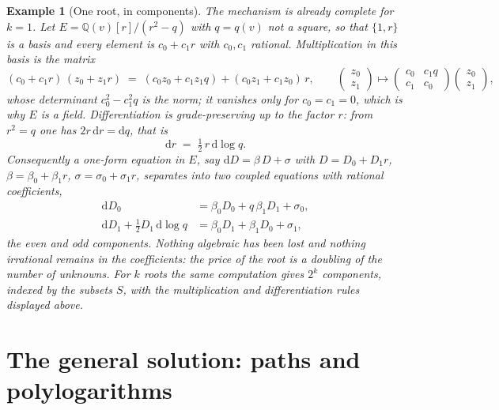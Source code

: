 \documentclass[11pt]{article}
\newcommand{\dd}{\mathrm{d}}
\newcommand{\Q}{\mathbb{Q}}
\newtheorem{example}[definition]{Example}
\begin{document}
\begin{example}[One root, in components]
\label{ex:galois1}
The mechanism is already complete for $k=1$.  Let
$E = \Q(v)[r]/(r^2-q)$ with $q = q(v)$ not a square, so that
$\{1, r\}$ is a basis and every element is $c_0 + c_1 r$ with
$c_0, c_1$ rational.  Multiplication in this basis is the matrix
\begin{equation}
  (c_0 + c_1 r)\,(z_0 + z_1 r)
  \;=\; (c_0z_0 + c_1z_1 q) + (c_0z_1 + c_1z_0)\,r ,
  \qquad
  \begin{pmatrix} z_0\\ z_1\end{pmatrix}
  \longmapsto
  \begin{pmatrix} c_0 & c_1 q\\ c_1 & c_0 \end{pmatrix}
  \begin{pmatrix} z_0\\ z_1\end{pmatrix} ,
\end{equation}
whose determinant $c_0^2 - c_1^2q$ is the norm; it vanishes only for
$c_0 = c_1 = 0$, which is why $E$ is a field.  Differentiation is
grade-preserving up to the factor $r$: from $r^2 = q$ one has
$2r\,\dd r = \dd q$, that is
\begin{equation}
  \dd r \;=\; \tfrac12\, r\, \dd\log q .
\end{equation}
Consequently a one-form equation in $E$, say
$\dd D = \beta\,D + \sigma$ with $D = D_0 + D_1 r$,
$\beta = \beta_0 + \beta_1 r$, $\sigma = \sigma_0+\sigma_1 r$,
separates into two coupled equations with rational coefficients,
\begin{align}
  \dd D_0 &= \beta_0 D_0 + q\,\beta_1 D_1 + \sigma_0 ,\\
  \dd D_1 + \tfrac12 D_1\,\dd\log q
          &= \beta_0 D_1 + \beta_1 D_0 + \sigma_1 ,
\end{align}
the even and odd components.  Nothing algebraic has been lost and
nothing irrational remains in the coefficients: the price of the root
is a doubling of the number of unknowns.  For $k$ roots the same
computation gives $2^k$ components, indexed by the subsets $S$, with
the multiplication and differentiation rules displayed above.
\end{example}

\section{The general solution: paths and polylogarithms}
\label{sec:paths}
\end{document}
